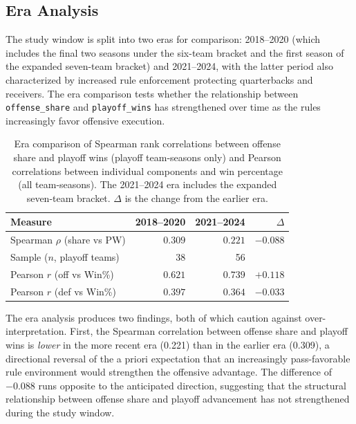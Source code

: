 \subsection{Era Analysis}
\label{sec:era-findings}

The study window is split into two eras for comparison: 2018--2020 (which
includes the final two seasons under the six-team bracket and the first season
of the expanded seven-team bracket) and 2021--2024, with the latter period
also characterized by increased rule enforcement protecting quarterbacks and
receivers. The era comparison tests whether the relationship between
\texttt{offense\_share} and \texttt{playoff\_wins} has strengthened over time
as the rules increasingly favor offensive execution.

\begin{table}[htbp]
  \centering
  \caption[Era comparison of xVOA correlations]{Era comparison of Spearman rank correlations between
           offense share and playoff wins
           (playoff team-seasons only) and Pearson correlations
           between individual \xvoa{} components and win percentage
           (all team-seasons). The 2021--2024 era includes the expanded
           seven-team bracket. $\Delta$ is the change from the earlier era.}
  \label{tab:era-comparison}
  \begin{tabular}{lrrr}
    \toprule
    \textbf{Measure} & \textbf{2018--2020}
      & \textbf{2021--2024} & \textbf{$\Delta$} \\
    \midrule
    Spearman $\rho$ (share vs PW)      & $0.309$ & $0.221$ & $-0.088$ \\
    Sample ($n$, playoff teams)        & 38      & 56      & \\[4pt]
    Pearson $r$ (off \xvoa{} vs Win\%) & $0.621$ & $0.739$ & $+0.118$ \\
    Pearson $r$ (def \xvoa{} vs Win\%) & $0.397$ & $0.364$ & $-0.033$ \\
    \bottomrule
  \end{tabular}
\end{table}

The era analysis produces two findings, both of which caution against
over-interpretation. First, the Spearman correlation between offense share and
playoff wins is \emph{lower} in the more recent era (0.221) than in the earlier
era (0.309), a directional reversal of the a priori expectation that an
increasingly pass-favorable rule environment would strengthen the offensive
advantage. The difference of $-0.088$ runs opposite to the anticipated direction,
suggesting that the structural relationship between offense share and playoff
advancement has not strengthened during the study window.

